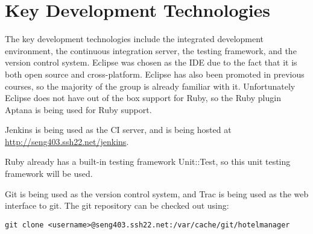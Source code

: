 \section{Key Development Technologies}

The key development technologies include the integrated development environment, the continuous integration server, the testing framework, and the version control system. Eclipse was chosen as the IDE due to the fact that it is both open source and cross-platform. Eclipse has also been promoted in previous courses, so the majority of the group is already familiar with it. Unfortunately Eclipse does not have out of the box support for Ruby, so the Ruby plugin Aptana is being used for Ruby support.

Jenkins is being used as the CI server, and is being hosted at \href{http://seng403.ssh22.net/jenkins}{http://seng403.ssh22.net/jenkins}.

Ruby already has a built-in testing framework Unit::Test, so this unit testing framework will be used.

Git is being used as the version control system, and Trac is being used as the web interface to git. The git repository can be checked out using:

\lstset{language=bash}
\begin{lstlisting}
git clone <username>@seng403.ssh22.net:/var/cache/git/hotelmanager
\end{lstlisting}
